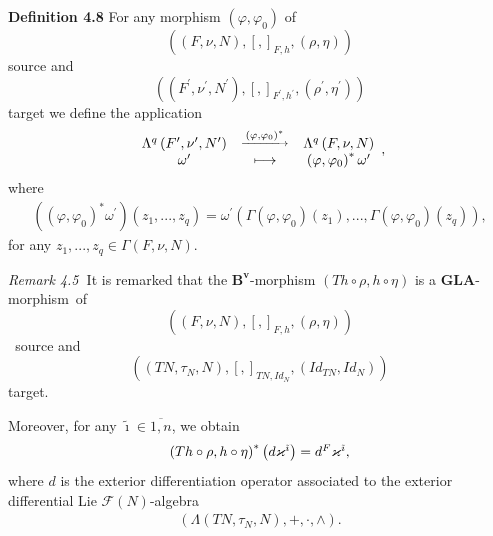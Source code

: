 \documentclass[11pt]{article}
\begin{document}
\textbf{Definition 4.8} For any morphism $\left( \varphi ,\varphi
_{0}\right) $ of
\begin{equation*}
\left( \left( F,\nu ,N\right) ,\left[ ,\right] _{F,h},\left( \rho ,\eta
\right) \right)
\end{equation*}
source and
\begin{equation*}
\left( \left( F^{\prime },\nu ^{\prime },N^{\prime }\right) ,\left[ ,\right]
_{F^{\prime },h^{\prime }},\left( \rho ^{\prime },\eta ^{\prime }\right)
\right)
\end{equation*}
target we define the application
\begin{equation*}
\begin{array}{ccc}
\Lambda ^{q}\left( F^{\prime },\nu ^{\prime },N^{\prime }\right) & ^{%
\underrightarrow{\ \left( \varphi ,\varphi _{0}\right) ^{\ast }\ }} &
\Lambda ^{q}\left( F,\nu ,N\right) \\
\omega ^{\prime } & \longmapsto & \left( \varphi ,\varphi _{0}\right) ^{\ast
}\omega ^{\prime }%
\end{array}%
,
\end{equation*}%
where
\begin{equation*}
\begin{array}{c}
\left( \left( \varphi ,\varphi _{0}\right) ^{\ast }\omega ^{\prime }\right)
\left( z_{1},...,z_{q}\right) =\omega ^{\prime }\left( \Gamma \left( \varphi
,\varphi _{0}\right) \left( z_{1}\right) ,...,\Gamma \left( \varphi ,\varphi
_{0}\right) \left( z_{q}\right) \right) ,%
\end{array}%
\end{equation*}%
for any $z_{1},...,z_{q}\in \Gamma \left( F,\nu ,N\right) .$

\bigskip \textit{\noindent Remark 4.5}\textbf{\ }It is remarked that the $%
\mathbf{B}^{\mathbf{v}}$-morphism $\left( Th\circ \rho ,h\circ \eta \right) $
is a $\mathbf{GLA}$-morphism~of
\begin{equation*}
\left( \left( F,\nu ,N\right) ,\left[ ,\right] _{F,h},\left( \rho ,\eta
\right) \right)
\end{equation*}%
\emph{\ }source and
\begin{equation*}
\left( \left( TN,\tau _{N},N\right) ,\left[ ,\right] _{TN,Id_{N}},\left(
Id_{TN},Id_{N}\right) \right)
\end{equation*}%
target.

Moreover, for any $\tilde{\imath}\in \overline{1,n}$, we obtain%
\begin{equation*}
\begin{array}{c}
\left( Th\circ \rho ,h\circ \eta \right) ^{\ast }\left( d\varkappa ^{\tilde{%
\imath}}\right) =d^{F}\varkappa ^{\tilde{\imath}},%
\end{array}%
\end{equation*}%
where $d$ is the exterior differentiation operator associated to the
exterior differential Lie $\mathcal{F}\left( N\right) $-algebra\emph{\ }%
\begin{equation*}
\begin{array}{c}
\left( \Lambda \left( TN,\tau _{N},N\right) ,+,\cdot ,\wedge \right) .%
\end{array}%
\end{equation*}
\end{document}
